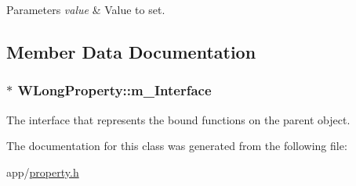 \begin{DoxyParams}{Parameters}
{\em value} & Value to set. \\
\hline
\end{DoxyParams}


\subsection{Member Data Documentation}
\hypertarget{class_w_long_property_aa2f15d5d8e88e1410664fec29b18dea6}{
\subsubsection[{m\-\_\-\-Interface}]{$\ast$ W\-Long\-Property\-::m\-\_\-\-Interface\hspace{0.3cm}{\ttfamily [protected]}}}\label{class_w_long_property_aa2f15d5d8e88e1410664fec29b18dea6}
The interface that represents the bound functions on the parent object. 

The documentation for this class was generated from the following file\-:\begin{DoxyCompactItemize}
\item 
app/\hyperlink{property_8h}{property.\-h}\end{DoxyCompactItemize}
